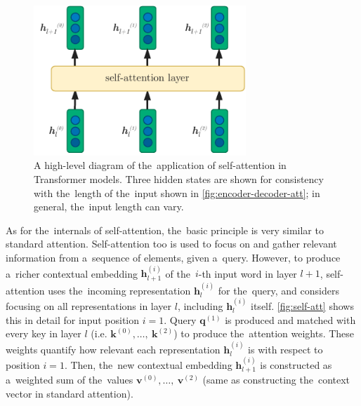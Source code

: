 \documentclass[bsc,frontabs,singlespacing,parskip,deptreport]{infthesis}
\begin{document}
{{{      \begin{figure}[h!t]
        \centering
        \includegraphics[width=8cm]{graphics/self-att-layer}
        \cprotect\caption{A high-level diagram of the~application of self-attention in Transformer models. Three hidden states are shown for consistency with the~length of the~input shown in \autoref{fig:encoder-decoder-att}; in general, the~input length can vary.}
        \label{fig:self-att-layer}
      \end{figure}

      As for the~internals of self-attention, the~basic principle is very similar to standard attention. Self-attention too is used to focus on and gather relevant information from a~sequence of elements, given a~query. However, to produce a~richer contextual embedding $\bm{h}_{l+1}^{(i)}$ of the~$i$-th input word in layer $l+1$, self-attention uses the~incoming representation $\bm{h}_l^{(i)}$ for the~query, and considers focusing on all representations in layer $l$, including $\bm{h}_l^{(i)}$ itself. \autoref{fig:self-att} shows this in detail for input position $i=1$. Query $\bm{q}^{(1)}$ is produced and matched with every key in layer $l$ (i.e. $\bm{k}^{(0)},\ldots,\ \bm{k}^{(2)}$) to produce the~attention weights. These weights quantify how relevant each representation $\bm{h}_l^{(i)}$ is with respect to position $i=1$. Then, the~new contextual embedding $\bm{h}_{l+1}^{(i)}$ is constructed as a~weighted sum of the~values $\bm{v}^{(0)},\ldots,\ \bm{v}^{(2)}$ (same as constructing the~context vector in standard attention).

}}}
\end{document}
